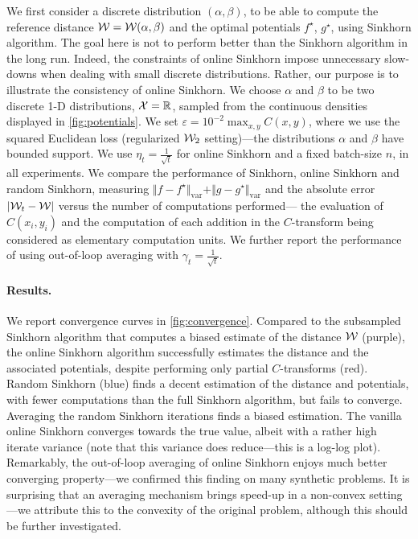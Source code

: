 We first consider a discrete distribution $(\alpha, \beta)$, to be able to
compute the reference distance $\mathcal{W} = \mathcal{W}(\alpha, \beta)$ and the optimal potentials $f^\star$,
$g^\star$, using Sinkhorn algorithm. The goal here is not to perform better
than the Sinkhorn algorithm in the long run. Indeed, the constraints of online
Sinkhorn impose unnecessary slow-downs when dealing with small discrete
distributions. Rather, our purpose is to illustrate the consistency of online
Sinkhorn. We choose $\alpha$ and $\beta$ to be two discrete 1-D distributions,
$\mathcal{X}=\mathbb{R}$, sampled from the continuous densities displayed in
\autoref{fig:potentials}. We set $\varepsilon = 10^{-2} \max_{x,y}
C(x,y)$, where we use the squared Euclidean loss (regularized $\mathcal{W}_2$
setting)---the distributions $\alpha$ and $\beta$ have bounded support. We use
$\eta_t = \frac{1}{\sqrt{t}}$ for online Sinkhorn and a fixed batch-size $n$, in
all experiments. We compare the performance of Sinkhorn, online Sinkhorn and
random Sinkhorn, measuring $\Vert f - f^\star \Vert_{\text{var}} + \Vert g -
g^\star \Vert_{\text{var}}$ and the absolute error $| \mathcal{W}_t - \mathcal{W} |$ versus the
number of computations performed--- the evaluation of $C(x_i, y_i)$ and the
computation of each addition in the $C$-transform being considered as elementary
computation units. We further report the performance of using out-of-loop
averaging with $\gamma_t = \frac{1}{\sqrt{t}}$.

\paragraph{Results.} We report convergence curves in \autoref{fig:convergence}.
Compared to the subsampled Sinkhorn algorithm that computes a biased estimate of
the distance $\mathcal{W}$ (purple), the online Sinkhorn algorithm successfully
estimates the distance and the associated potentials, despite performing only
partial $C$-transforms (red). Random Sinkhorn (blue) finds a decent estimation
of the distance and potentials, with fewer computations than the full Sinkhorn
algorithm, but fails to converge. Averaging the random Sinkhorn iterations finds
a biased estimation. The vanilla online Sinkhorn converges towards the true
value, albeit with a rather high iterate variance (note that this variance does
reduce---this is a log-log plot). Remarkably, the out-of-loop averaging of
online Sinkhorn enjoys much better converging property---we confirmed this
finding on many synthetic problems. It is surprising that an averaging mechanism
brings speed-up in a non-convex setting---we attribute this to the convexity of
the original problem, although this should be further investigated.

